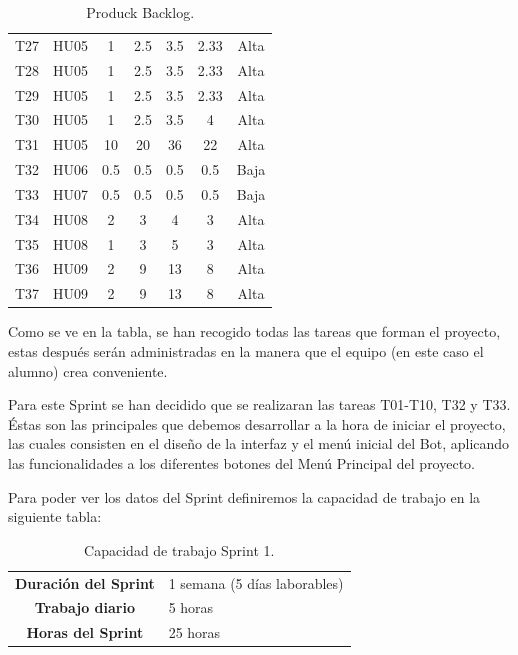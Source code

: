 \begin{table}[H]
\begin{center}
\begin{longtable}{| c | c | c | c | c | c | c |}
			T27 & HU05 & 1 & 2.5 & 3.5 & 2.33 & Alta \\
			T28 & HU05 & 1 & 2.5 & 3.5 & 2.33 & Alta \\
			T29 & HU05 & 1 & 2.5 & 3.5 & 2.33 & Alta \\
			T30 & HU05 & 1 & 2.5 & 3.5 & 4 & Alta \\		
			T31 & HU05 & 10 & 20 & 36 & 22 & Alta \\		
			T32 & HU06 & 0.5 & 0.5 & 0.5 & 0.5 & Baja \\
			T33 & HU07 & 0.5 & 0.5 & 0.5 & 0.5 & Baja \\
			T34 & HU08 & 2 & 3 & 4 & 3 & Alta \\
			T35 & HU08 & 1 & 3 & 5 & 3 & Alta \\
			T36 & HU09 & 2 & 9 & 13 & 8 & Alta \\
			T37 & HU09 & 2 & 9 & 13 & 8 & Alta \\ \hline
		\end{longtable}
		\caption{Produck Backlog.}
	\end{center}
\end{table}

Como se ve en la tabla, se han recogido todas las tareas que forman el proyecto, estas después serán administradas en la manera que el equipo (en este caso el alumno) crea conveniente.

Para este Sprint se han decidido que se realizaran las tareas T01-T10, T32 y T33. Éstas son las principales que debemos desarrollar a la hora de iniciar el proyecto, las cuales consisten en el diseño de la interfaz y el menú inicial del Bot, aplicando las funcionalidades a los diferentes botones del Menú Principal del proyecto.

Para poder ver los datos del Sprint definiremos la capacidad de trabajo en la siguiente tabla:

\begin{table}[H]
	\begin{center}
		\begin{tabular}{| c | p{9cm} |}
			\hline
			
			\textbf{Duración del Sprint} & 1 semana (5 días laborables) \\
			\textbf{Trabajo diario} & 5 horas \\
			\textbf{Horas del Sprint} & 25 horas \\ \hline
		\end{tabular}
		\caption{Capacidad de trabajo Sprint 1.}
	\end{center}
\end{table}

